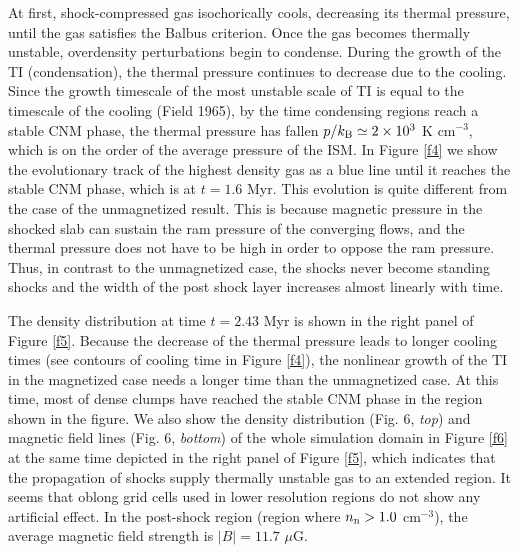 \documentclass[12pt,preprint]{aastex}
\begin{document}
At first, shock-compressed gas isochorically cools, decreasing its thermal pressure, until the gas satisfies the Balbus criterion.
Once the gas becomes thermally unstable, overdensity perturbations begin to condense.
During the growth of the TI (condensation), the thermal pressure continues to decrease due to the cooling.
Since the growth timescale of the most unstable scale of TI is equal to the timescale of the cooling (Field 1965), by the time condensing regions reach a stable CNM phase, the thermal pressure has fallen $p/k_{\rm B}\simeq 2\times10^{3}$ K cm$^{-3}$, which is on the order of the average pressure of the ISM.
In Figure \ref{f4} we show the evolutionary track of the highest density gas as a blue line until it reaches the stable CNM phase, which is at $t=1.6$ Myr.
This evolution is quite different from the case of the unmagnetized result.
This is because magnetic pressure in the shocked slab can sustain the ram pressure of the converging flows, and the thermal pressure does not have to be high in order to oppose the ram pressure.
Thus, in contrast to the unmagnetized case, the shocks never become standing shocks and the width of the post shock layer increases almost linearly with time.

The density distribution at time $t=2.43$ Myr is shown in the right panel of Figure \ref{f5}.
Because the decrease of the thermal pressure leads to longer cooling times (see contours of cooling time in Figure \ref{f4}), the nonlinear growth of the TI in the magnetized case needs a longer time than the unmagnetized case.
At this time, most of dense clumps have reached the stable CNM phase in the region shown in the figure.
We also show the density distribution (Fig. 6, \textit{top}) and magnetic field lines (Fig. 6, \textit{bottom}) of the whole simulation domain in Figure \ref{f6} at the same time depicted in the right panel of Figure \ref{f5}, which indicates that the propagation of shocks supply thermally unstable gas to an extended region.
It seems that oblong grid cells used in lower resolution regions do not show any artificial effect.
In the post-shock region (region where $n_{\rm n}>1.0$ cm$^{-3}$), the average magnetic field strength is $|B|= 11.7$ $\mu$G.
\end{document}

